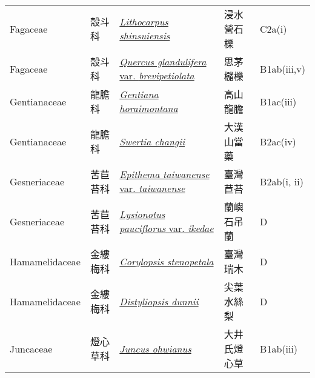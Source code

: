 {\begin{longtable}{p{2.5cm}p{2.5cm}p{4.5cm}p{2.5cm}p{3cm}}
    Fagaceae & 殼斗科 & \href{http://www.theplantlist.org/tpl1.1/search?q=Lithocarpus+shinsuiensis}{\textit{Lithocarpus shinsuiensis} } & 浸水營石櫟 & C2a(i) \index{Lithocarpus@\textit{Lithocarpus}!shinsuiensis@\textit{shinsuiensis}}  \index{浸水營石櫟} \\
    Fagaceae & 殼斗科 & \href{http://www.theplantlist.org/tpl1.1/search?q=Quercus+glandulifera+var.+brevipetiolata}{\textit{Quercus glandulifera} var. \textit{brevipetiolata} } & 思茅櫧櫟 & B1ab(iii,v) \index{Quercus@\textit{Quercus}!glandulifera@\textit{glandulifera}!var. brevipetiolata@var. \textit{brevipetiolata}}  \index{思茅櫧櫟} \\
    Gentianaceae & 龍膽科 & \href{http://www.theplantlist.org/tpl1.1/search?q=Gentiana+horaimontana}{\textit{Gentiana horaimontana} } & 高山龍膽 & B1ac(iii) \index{Gentiana@\textit{Gentiana}!horaimontana@\textit{horaimontana}}  \index{高山龍膽} \\
    Gentianaceae & 龍膽科 & \href{http://www.theplantlist.org/tpl1.1/search?q=Swertia+changii}{\textit{Swertia changii} } & 大漢山當藥 & B2ac(iv) \index{Swertia@\textit{Swertia}!changii@\textit{changii}}  \index{大漢山當藥} \\
    Gesneriaceae & 苦苣苔科 & \href{http://www.theplantlist.org/tpl1.1/search?q=Epithema+taiwanense+var.+taiwanense}{\textit{Epithema taiwanense} var. \textit{taiwanense} } & 臺灣苣苔 & B2ab(i, ii) \index{Epithema@\textit{Epithema}!taiwanense@\textit{taiwanense}!var. taiwanense@var. \textit{taiwanense}}  \index{臺灣苣苔} \\
    Gesneriaceae & 苦苣苔科 & \href{http://www.theplantlist.org/tpl1.1/search?q=Lysionotus+pauciflorus+var.+ikedae}{\textit{Lysionotus pauciflorus} var. \textit{ikedae} } & 蘭嶼石吊蘭 & D \index{Lysionotus@\textit{Lysionotus}!pauciflorus@\textit{pauciflorus}!var. ikedae@var. \textit{ikedae}}  \index{蘭嶼石吊蘭} \\
    Hamamelidaceae & 金縷梅科 & \href{http://www.theplantlist.org/tpl1.1/search?q=Corylopsis+stenopetala}{\textit{Corylopsis stenopetala} } & 臺灣瑞木 & D \index{Corylopsis@\textit{Corylopsis}!stenopetala@\textit{stenopetala}}  \index{臺灣瑞木} \\
    Hamamelidaceae & 金縷梅科 & \href{http://www.theplantlist.org/tpl1.1/search?q=Distyliopsis+dunnii}{\textit{Distyliopsis dunnii} } & 尖葉水絲梨 & D \index{Distyliopsis@\textit{Distyliopsis}!dunnii@\textit{dunnii}}  \index{尖葉水絲梨} \\
    Juncaceae & 燈心草科 & \href{http://www.theplantlist.org/tpl1.1/search?q=Juncus+ohwianus}{\textit{Juncus ohwianus} } & 大井氏燈心草 & B1ab(iii) \index{Juncus@\textit{Juncus}!ohwianus@\textit{ohwianus}}  \index{大井氏燈心草} \\

\end{longtable}}
